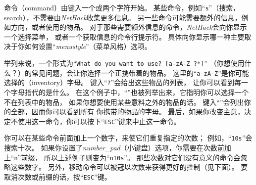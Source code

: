 \documentclass[a4paper, 10pt]{article}
\begin{document}
命令（command）由键入一个或两个字符开始。
某些命令，例如“{\tt s}”（搜索，search），不需要由{\it NetHack\/}收集更多信息。
另一些命令可能需要额外的信息，例如方向，或者使用的物品。
对于那些需要额外信息的命令，{\it NetHack\/}会向你显示一个选择菜单，
或者一个获取信息的命令行提示符。
具体向你显示哪一种主要取决于你如何设置“{\it menustyle\/}”（菜单风格）选项。

举列来说，一个形式为“{\tt What do you want to use? [a-zA-Z\ ?*]}”
（你想使用什么？）的常见问题，会让你选择一个正携带着的物品。
这里的“{\tt a-zA-Z}”是你可能选择的\zhTransInventory{}（inventory）字母。
键入“{\tt ?}”会给出这些物品的\zhTransInventory{}列表，
让你可以看到每一个字母指代的是什么。
在这个例子中，“{\tt *}”也被列举出来，它指明你可以选择一个不在列表中的物品，
如果你想要使用某些意料之外的物品的话。
键入“{\tt *}”会列出你的全部\zhTransInventory，因而你可以看到所有
你携带的物品的\zhTransInventory{}字母。
最后，如果你改变主意，决定不使用这一命令，你可以按下“{\tt ESC}”键来中止这一命令。

你可以在某些命令前面加上一个数字，来使它们重复指定的次数；
例如，“{\tt 10s}”会搜索十次。
如果你设置了{\it number\_pad\/}（小键盘）选项，你需要在次数前加上“{\tt n}”前缀，
所以上述例子则变为“{\tt n10s}”。
那些次数对它们没有意义的命令会忽略这些数字。
另外，移动命令可以被冠以次数来获得更好的控制（见下面）。
要取消次数或前缀的话，按“{\tt ESC}”键。
\end{document}
